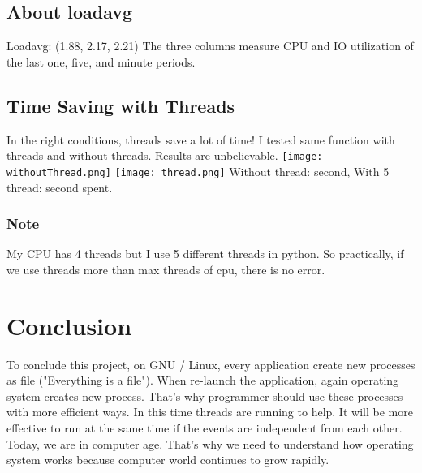 \documentclass[]{article}
\begin{document}
\subsection{About loadavg}
Loadavg: (1.88, 2.17, 2.21)
\newline
The three columns measure CPU and IO utilization of the last \boldsymbol one, \boldsymbol five, and  \boldsymbol minute periods. 

\subsection{Time Saving with Threads}
In the right conditions, threads save a lot of time! I tested same function with threads and without threads. Results are unbelievable. 
\newline\newline
\texttt{[image: withoutThread.png]}
\texttt{[image: thread.png]}
\newline
Without thread:  second,    With 5 thread:  second spent.

\subsubsection*{Note}
My CPU has 4 threads but I use 5 different threads in python. So practically, if we use threads more than max threads of cpu, there is no error.
\section{Conclusion}
To conclude this project, on GNU / Linux, every application create new processes as file ("Everything is a file"). When re-launch the application, again operating system creates new process. That's why programmer should use these processes with more efficient ways. In this time threads are running to help. It will be more effective to run at the same time if the events are independent from each other. Today, we are in computer age. That's why we need to understand how operating system works because computer world continues to grow rapidly. 



\nocite{*}


\end{document}
